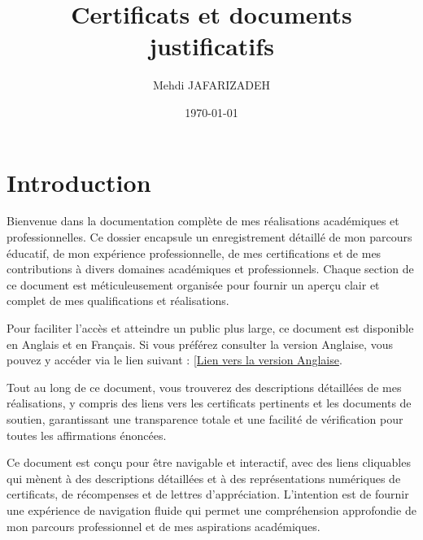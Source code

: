 \documentclass{article}
\begin{document}
\title{Certificats et documents justificatifs}
\author{Mehdi JAFARIZADEH}
\date{\today}
\maketitle

\tableofcontents



\newpage
\section{Introduction}
Bienvenue dans la documentation complète de mes réalisations académiques et professionnelles. Ce dossier encapsule un enregistrement détaillé de mon parcours éducatif, de mon expérience professionnelle, de mes certifications et de mes contributions à divers domaines académiques et professionnels. Chaque section de ce document est méticuleusement organisée pour fournir un aperçu clair et complet de mes qualifications et réalisations.

Pour faciliter l'accès et atteindre un public plus large, ce document est disponible en Anglais et en Français. Si vous préférez consulter la version Anglaise, vous pouvez y accéder via le lien suivant : \href{https://drive.google.com/file/d/1SwrSxWrC8iVVY-hpDYJElf16-4BYZWbR/view?usp=drive_link}{[Lien vers la version Anglaise}.

Tout au long de ce document, vous trouverez des descriptions détaillées de mes réalisations, y compris des liens vers les certificats pertinents et les documents de soutien, garantissant une transparence totale et une facilité de vérification pour toutes les affirmations énoncées.

Ce document est conçu pour être navigable et interactif, avec des liens cliquables qui mènent à des descriptions détaillées et à des représentations numériques de certificats, de récompenses et de lettres d'appréciation. L'intention est de fournir une expérience de navigation fluide qui permet une compréhension approfondie de mon parcours professionnel et de mes aspirations académiques.

\newpage



\end{document}
